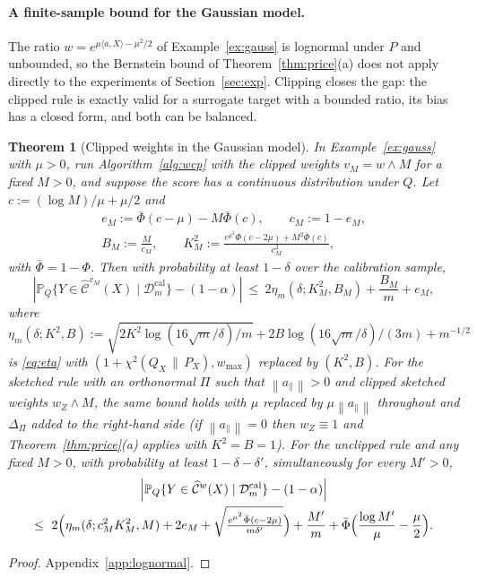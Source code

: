 \documentclass[11pt,a4paper]{article}
\newcommand{\PX}{P_X}
\newcommand{\QX}{Q_X}
\newcommand{\chisq}{\chi^2(\QX\,\|\,\PX)}
\newcommand{\norm}[1]{\left\|#1\right\|}
\newcommand{\abs}[1]{\left|#1\right|}
\newcommand{\Prob}{\mathbb{P}}
\newcommand{\Cset}{\widehat{\mathcal C}}
\theoremstyle{plain}
\newtheorem{theorem}{Theorem}[section]
\theoremstyle{definition}
\theoremstyle{remark}
\begin{document}
\paragraph{A finite-sample bound for the Gaussian model.}\label{sec:lognormal}

The ratio $w=e^{\mu\langle a,X\rangle-\mu^2/2}$ of Example~\ref{ex:gauss} is lognormal under $P$ and unbounded, so the Bernstein bound of Theorem~\ref{thm:price}(a) does not apply directly to the experiments of Section~\ref{sec:exp}. Clipping closes the gap: the clipped rule is exactly valid for a surrogate target with a bounded ratio, its bias has a closed form, and both can be balanced.

\begin{theorem}[Clipped weights in the Gaussian model]\label{thm:lognormal}
In Example~\ref{ex:gauss} with $\mu>0$, run Algorithm~\ref{alg:wcp} with the clipped weights $v_M=w\wedge M$ for a fixed $M>0$, and suppose the score has a continuous distribution under $Q$. Let $c:=(\log M)/\mu+\mu/2$ and
\begin{gather*}
e_M:=\bar\Phi(c-\mu)-M\bar\Phi(c),\qquad c_M:=1-e_M,\\
B_M:=\frac{M}{c_M},\qquad K_M^2:=\frac{e^{\mu^2}\Phi(c-2\mu)+M^2\bar\Phi(c)}{c_M^2},
\end{gather*}
with $\bar\Phi=1-\Phi$. Then with probability at least $1-\delta$ over the calibration sample,
\[
\abs{\Prob_Q\{Y\in\Cset^{v_M}(X)\mid\mathcal D^{\mathrm{cal}}_m\}-(1-\alpha)}\ \le\ 2\eta_m(\delta;K_M^2,B_M)+\frac{B_M}{m}+e_M,
\]
where $\eta_m(\delta;K^2,B):=\sqrt{2K^2\log(16\sqrt m/\delta)/m}+2B\log(16\sqrt m/\delta)/(3m)+m^{-1/2}$ is \eqref{eq:eta} with $(1+\chisq,w_{\max})$ replaced by $(K^2,B)$. For the sketched rule with an orthonormal $\Pi$ such that $\norm{a_\parallel}>0$ and clipped sketched weights $w_Z\wedge M$, the same bound holds with $\mu$ replaced by $\mu\norm{a_\parallel}$ throughout and $\Delta_\Pi$ added to the right-hand side (if $\norm{a_\parallel}=0$ then $w_Z\equiv1$ and Theorem~\ref{thm:price}(a) applies with $K^2=B=1$). For the unclipped rule and any fixed $M>0$, with probability at least $1-\delta-\delta'$, simultaneously for every $M'>0$,
\begin{multline*}
\abs{\Prob_Q\{Y\in\Cset^{w}(X)\mid\mathcal D^{\mathrm{cal}}_m\}-(1-\alpha)}\\
\le\ 2\Bigl(\eta_m(\delta;c_M^2K_M^2,M)+2e_M+\sqrt{\tfrac{e^{\mu^2}\bar\Phi(c-2\mu)}{m\delta'}}\Bigr)+\frac{M'}{m}+\bar\Phi\Bigl(\frac{\log M'}{\mu}-\frac\mu2\Bigr).
\end{multline*}
\end{theorem}
\begin{proof}
Appendix~\ref{app:lognormal}.
\end{proof}
\end{document}

